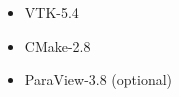 \documentclass{InsightArticle}
\begin{document}
\begin{itemize}
  \item  VTK-5.4
  \item  CMake-2.8
  \item  ParaView-3.8 (optional)
\end{itemize}

\appendix

%
%



\end{document}
